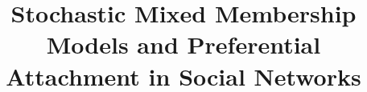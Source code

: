\documentclass[numbib]{comnet}
\newcommand{\blind}{0}
\begin{document}



%

\title{Stochastic Mixed Membership Models and Preferential Attachment in Social Networks}

\author{%
\address{Univ. Grenoble Alpes, CNRS, Grenoble INP, LIG}
\address{Univ. Grenoble Alpes, CNRS, Grenoble INP, LIG}
\and
\address{Univ. Lyon, UJM-Saint-Etienne, CNRS, Institut d’Optique Graduate School, LHC}
}
\end{document}
